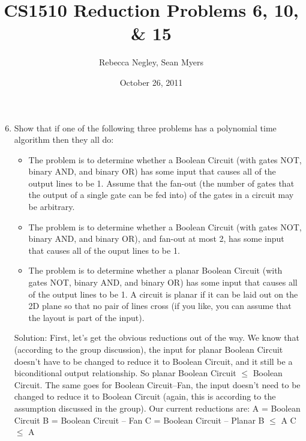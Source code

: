 \documentclass{article}
\title{CS1510  Reduction Problems 6, 10, \& 15}
\author{Rebecca Negley, Sean Myers}
\date{October 26, 2011}
\begin{document}
\maketitle

\begin{enumerate}
\setcounter{enumi}{5}
\item Show that if one of the following three problems has a polynomial time algorithm then they all do:
\begin{itemize}
\item The problem is to determine whether a Boolean Circuit (with gates NOT, binary AND, and binary OR) has some input that causes all of the output lines to be 1. Assume that the fan-out (the number of gates that the output of a single gate can be fed into) of the gates in a circuit may be arbitrary.
\item The problem is to determine whether a Boolean Circuit (with gates NOT, binary AND, and binary OR), and fan-out at most 2, has some input that causes all of the ouput lines to be 1.
\item The problem is to determine whether a planar Boolean Circuit (with gates NOT, binary AND, and binary OR) has some input that causes all of the output lines to be 1. A circuit is planar if it can be laid out on the 2D plane so that no pair of lines cross (if you like, you can assume that the layout is part of the input).
\end{itemize}
Solution: First, let's get the obvious reductions out of the way. We know that (according to the group discussion), the input for planar Boolean Circuit doesn't have to be changed to reduce it to Boolean Circuit, and it still be a biconditional output relationship. So planar Boolean Circuit $\le$ Boolean Circuit. The same goes for Boolean Circuit--Fan, the input doesn't need to be changed to reduce it to Boolean Circuit (again, this is according to the assumption discussed in the group). Our current reductions are:
A = Boolean Circuit \newline
B = Boolean Circuit -- Fan \newline
C = Boolean Circuit -- Planar \newline
B $\le$ A \newline
C $\le$ A \newline


\end{enumerate}
\end{document}
